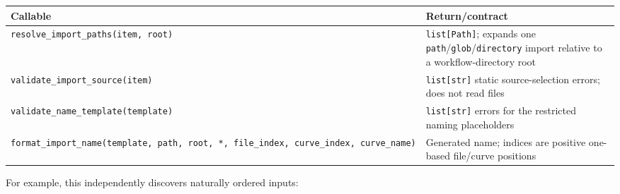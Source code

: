 \documentclass[
  10pt,
  a4paper,
  oneside]{scrreprt}
\begin{document}
\begin{longtable}[]{@{}ll@{}}
\toprule
\begin{minipage}[b]{0.47\columnwidth}\raggedright
Callable\strut
\end{minipage} & \begin{minipage}[b]{0.47\columnwidth}\raggedright
Return/contract\strut
\end{minipage}\tabularnewline
\midrule
\endhead
\begin{minipage}[t]{0.47\columnwidth}\raggedright
\texttt{resolve\_import\_paths(item,\ root)}\strut
\end{minipage} & \begin{minipage}[t]{0.47\columnwidth}\raggedright
\texttt{list{[}Path{]}}; expands one
\texttt{path}/\texttt{glob}/\texttt{directory} import relative to a
workflow-directory root\strut
\end{minipage}\tabularnewline
\begin{minipage}[t]{0.47\columnwidth}\raggedright
\texttt{validate\_import\_source(item)}\strut
\end{minipage} & \begin{minipage}[t]{0.47\columnwidth}\raggedright
\texttt{list{[}str{]}} static source-selection errors; does not read
files\strut
\end{minipage}\tabularnewline
\begin{minipage}[t]{0.47\columnwidth}\raggedright
\texttt{validate\_name\_template(template)}\strut
\end{minipage} & \begin{minipage}[t]{0.47\columnwidth}\raggedright
\texttt{list{[}str{]}} errors for the restricted naming
placeholders\strut
\end{minipage}\tabularnewline
\begin{minipage}[t]{0.47\columnwidth}\raggedright
\texttt{format\_import\_name(template,\ path,\ root,\ *,\ file\_index,\ curve\_index,\ curve\_name)}\strut
\end{minipage} & \begin{minipage}[t]{0.47\columnwidth}\raggedright
Generated name; indices are positive one-based file/curve
positions\strut
\end{minipage}\tabularnewline
\bottomrule
\end{longtable}

For example, this independently discovers naturally ordered inputs:
\end{document}
